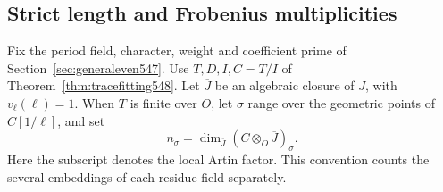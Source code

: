 \documentclass[a4paper,11pt]{article}
\theoremstyle{definition}
\theoremstyle{remark}
\numberwithin{equation}{section}
\begin{document}
\subsection{Strict length and Frobenius multiplicities}
\label{sec:mixedmultiplicity550}

Fix the period field, character, weight and coefficient prime of
Section~\ref{sec:generaleven547}. Use \(T,D,I,C=T/I\) of
Theorem~\ref{thm:tracefitting548}. Let \(\overline J\) be an
algebraic closure of \(J\), with \(v_\ell(\ell)=1\). When \(T\)
is finite over \(O\), let \(\sigma\) range over the geometric
points of \(C[1/\ell]\), and set
\[
 n_\sigma=\dim_{\overline J}(C\otimes_O\overline J)_\sigma .
\]
Here the subscript denotes the local Artin factor. This convention
counts the several embeddings of each residue field separately.
\end{document}
